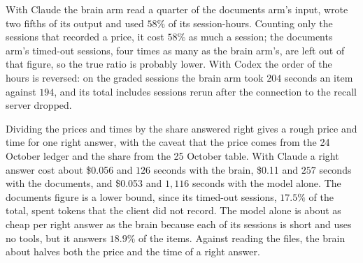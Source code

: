 With Claude the brain arm read a quarter of the documents arm's input, wrote two fifths of its output and used $58\%$ of its session-hours. Counting only the sessions that recorded a price, it cost $58\%$ as much a session; the documents arm's timed-out sessions, four times as many as the brain arm's, are left out of that figure, so the true ratio is probably lower. With Codex the order of the hours is reversed: on the graded sessions the brain arm took $204$ seconds an item against $194$, and its total includes sessions rerun after the connection to the recall server dropped.

Dividing the prices and times by the share answered right gives a rough price and time for one right answer, with the caveat that the price comes from the 24 October ledger and the share from the 25 October table. With Claude a right answer cost about \$0.056 and $126$ seconds with the brain, \$0.11 and $257$ seconds with the documents, and \$0.053 and $1{,}116$ seconds with the model alone. The documents figure is a lower bound, since its timed-out sessions, $17.5\%$ of the total, spent tokens that the client did not record. The model alone is about as cheap per right answer as the brain because each of its sessions is short and uses no tools, but it answers $18.9\%$ of the items. Against reading the files, the brain about halves both the price and the time of a right answer.
